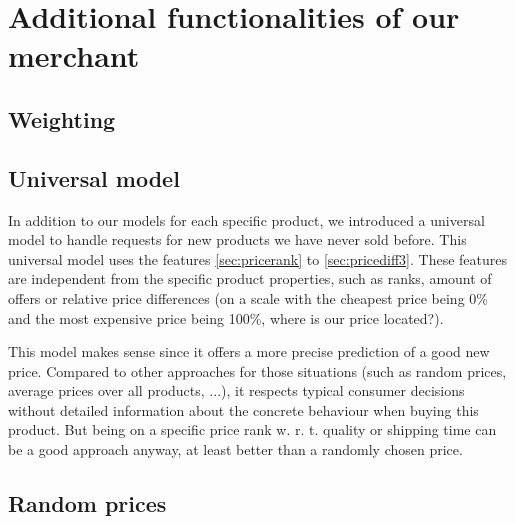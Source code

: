 \section{Additional functionalities of our merchant}
\subsection{Weighting}
\subsection{Universal model}
	In addition to our models for each specific product, we introduced a universal model to handle requests for new products we have never sold before. This universal model uses the features \ref{sec:pricerank} to \ref{sec:pricediff3}. These features are independent from the specific product properties, such as ranks, amount of offers or relative price differences (on a scale with the cheapest price being 0\% and the most expensive price being 100\%, where is our price located?).

	This model makes sense since it offers a more precise prediction of a good new price. Compared to other approaches for those situations (such as random prices, average prices over all products, ...), it respects typical consumer decisions without detailed information about the concrete behaviour when buying this product. But being on a specific price rank w. r. t. quality or shipping time can be a good approach anyway, at least better than a randomly chosen price.
\subsection{Random prices}
	

